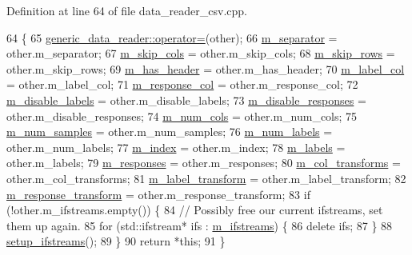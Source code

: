 Definition at line 64 of file data\+\_\+reader\+\_\+csv.\+cpp.


\begin{DoxyCode}
64                                                          \{
65   \hyperlink{classlbann_1_1generic__data__reader_aec7e626e6efa2a4bf23f931e2ef8f607}{generic\_data\_reader::operator=}(other);
66   \hyperlink{classlbann_1_1csv__reader_abab4a731daa751856f083c117ac8862a}{m\_separator} = other.m\_separator;
67   \hyperlink{classlbann_1_1csv__reader_a3a6cb698fbeb4abd0032e2b018bbb326}{m\_skip\_cols} = other.m\_skip\_cols;
68   \hyperlink{classlbann_1_1csv__reader_a52b9eebd06309a8d8858ce74ecd8cce0}{m\_skip\_rows} = other.m\_skip\_rows;
69   \hyperlink{classlbann_1_1csv__reader_a36d5e554882e8a32e1d111701af3bd90}{m\_has\_header} = other.m\_has\_header;
70   \hyperlink{classlbann_1_1csv__reader_acc02e56c81421c4507f7178ca8461b04}{m\_label\_col} = other.m\_label\_col;
71   \hyperlink{classlbann_1_1csv__reader_a1cfa3562ecd0a7f6358290f299de5812}{m\_response\_col} = other.m\_response\_col;
72   \hyperlink{classlbann_1_1csv__reader_a5f013485fc1466dcf1f78ef020b845d4}{m\_disable\_labels} = other.m\_disable\_labels;
73   \hyperlink{classlbann_1_1csv__reader_a1e133c3585df5f131b4772f618e77ad2}{m\_disable\_responses} = other.m\_disable\_responses;
74   \hyperlink{classlbann_1_1csv__reader_a7607d3f6b356538671147a0b8f7b09c8}{m\_num\_cols} = other.m\_num\_cols;
75   \hyperlink{classlbann_1_1csv__reader_a37ee216c31ea3d7919fce58215ec410a}{m\_num\_samples} = other.m\_num\_samples;
76   \hyperlink{classlbann_1_1csv__reader_a8e377a058039b3d906738143356b93e4}{m\_num\_labels} = other.m\_num\_labels;
77   \hyperlink{classlbann_1_1csv__reader_a2a959e7839d2d11e2deba98ba1884006}{m\_index} = other.m\_index;
78   \hyperlink{classlbann_1_1csv__reader_a1f11d02df556a4ec638f332ccfc03eb2}{m\_labels} = other.m\_labels;
79   \hyperlink{classlbann_1_1csv__reader_a8b7e23827c7cbf7c8eff40cad9cb6afc}{m\_responses} = other.m\_responses;
80   \hyperlink{classlbann_1_1csv__reader_aad98a20225b1f2545de32b4c19c8285b}{m\_col\_transforms} = other.m\_col\_transforms;
81   \hyperlink{classlbann_1_1csv__reader_aa9b671a172828980cb9c91180c3d0ad8}{m\_label\_transform} = other.m\_label\_transform;
82   \hyperlink{classlbann_1_1csv__reader_a161c3606668efbc8910cad2f7fa01ed3}{m\_response\_transform} = other.m\_response\_transform;
83   \textcolor{keywordflow}{if} (!other.m\_ifstreams.empty()) \{
84     \textcolor{comment}{// Possibly free our current ifstreams, set them up again.}
85     \textcolor{keywordflow}{for} (std::ifstream* ifs : \hyperlink{classlbann_1_1csv__reader_a41ede08dd2ed420bf8f6c6670d892caf}{m\_ifstreams}) \{
86       \textcolor{keyword}{delete} ifs;
87     \}
88     \hyperlink{classlbann_1_1csv__reader_afc689f206192339770ee9fbd132492bb}{setup\_ifstreams}();
89   \}
90   \textcolor{keywordflow}{return} *\textcolor{keyword}{this};
91 \}
\end{DoxyCode}
